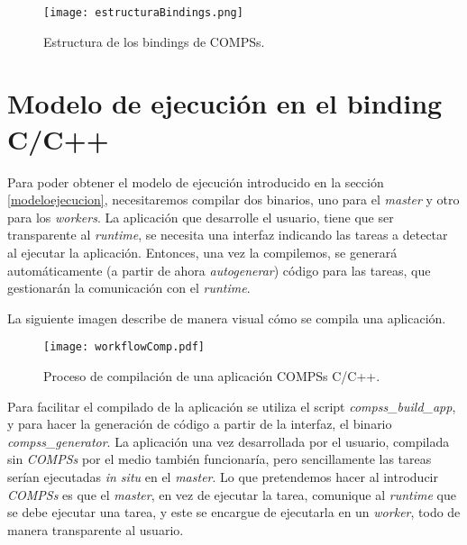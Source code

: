 \begin{figure}[h]
    \centering 
    \caption{Estructura de los bindings de COMPSs.}
    \texttt{[image: estructuraBindings.png]}
    \label{fig:estructurabindings}
\end{figure}

\section{Modelo de ejecución en el binding C/C++}
\label{sec:bindings}

Para poder obtener el modelo de ejecución introducido en la sección \ref{modeloejecucion}, necesitaremos compilar dos binarios, uno para el \textit{master} y otro para los \textit{workers}. La aplicación que desarrolle el usuario, tiene que ser transparente al \textit{runtime}, se necesita una interfaz indicando las tareas a detectar al ejecutar la aplicación. Entonces, una vez la compilemos, se generará automáticamente (a partir de ahora \textit{autogenerar}) código para las tareas, que gestionarán la comunicación con el \textit{runtime}.
\par\smallskip
La siguiente imagen describe de manera visual cómo se compila una aplicación. 

\begin{figure}[h]
    \centering 
    \caption{Proceso de compilación de una aplicación COMPSs C/C++.}
    \texttt{[image: workflowComp.pdf]}
    \label{fig:workflowcompilado}
\end{figure}

\par\bigskip
Para facilitar el compilado de la aplicación se utiliza el script \textit{compss\_build\_app}, y para hacer la generación de código a partir de la interfaz, el binario \textit{compss\_generator}.
La aplicación una vez desarrollada por el usuario, compilada sin \textit{COMPSs} por el medio también funcionaría, pero sencillamente las tareas serían ejecutadas \textit{in situ} en el \textit{master}.  Lo que pretendemos hacer al introducir \textit{COMPSs} es que el \textit{master}, en vez de ejecutar la tarea, comunique al \textit{runtime} que se debe ejecutar una tarea, y este se encargue de ejecutarla en un \textit{worker}, todo de manera transparente al usuario.

